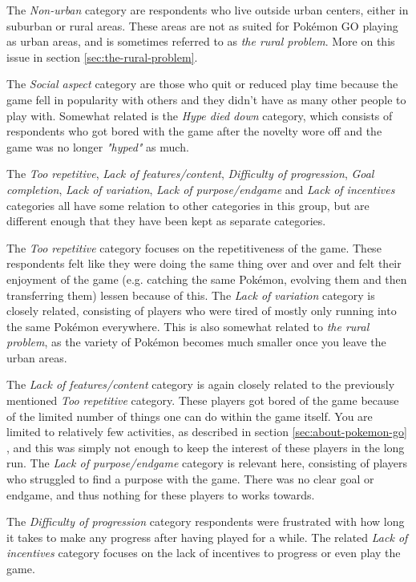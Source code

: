 The \emph{Non-urban} category are respondents who live outside urban centers, either in suburban or rural areas. These areas are not as suited for Pokémon GO playing as urban areas, and is sometimes referred to as \emph{the rural problem}. More on this issue in section \ref{sec:the-rural-problem}.

The \emph{Social aspect} category are those who quit or reduced play time because the game fell in popularity with others and they didn't have as many other people to play with. Somewhat related is the \emph{Hype died down} category, which consists of respondents who got bored with the game after the novelty wore off and the game was no longer \emph{"hyped"} as much.

The \emph{Too repetitive}, \emph{Lack of features/content}, \emph{Difficulty of progression}, \emph{Goal completion}, \emph{Lack of variation}, \emph{Lack of purpose/endgame} and \emph{Lack of incentives} categories all have some relation to other categories in this group, but are different enough that they have been kept as separate categories. 

The \emph{Too repetitive} category focuses on the repetitiveness of the game. These respondents felt like they were doing the same thing over and over and felt their enjoyment of the game (e.g. catching the same Pokémon, evolving them and then transferring them) lessen because of this. The \emph{Lack of variation} category is closely related, consisting of players who were tired of mostly only running into the same Pokémon everywhere. This is also somewhat related to \emph{the rural problem}, as the variety of Pokémon becomes much smaller once you leave the urban areas.

The \emph{Lack of features/content} category is again closely related to the previously mentioned \emph{Too repetitive} category. These players got bored of the game because of the limited number of things one can do within the game itself. You are limited to relatively few activities, as described in section \ref{sec:about-pokemon-go} , and this was simply not enough to keep the interest of these players in the long run. The \emph{Lack of purpose/endgame} category is relevant here, consisting of players who struggled to find a purpose with the game. There was no clear goal or endgame, and thus nothing for these players to works towards.

The \emph{Difficulty of progression} category respondents were frustrated with how long it takes to make any progress after having played for a while. The related \emph{Lack of incentives} category focuses on the lack of incentives to progress or even play the game.

